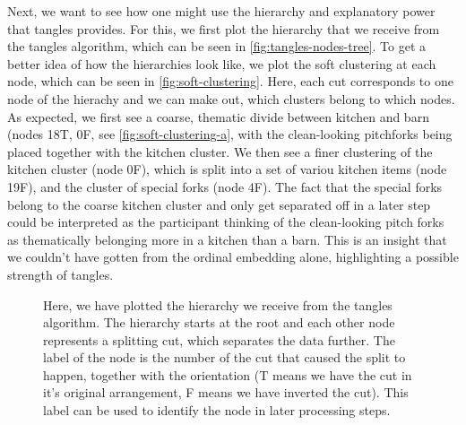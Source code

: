 Next, we want to see how one might use the hierarchy and explanatory power that tangles provides. For this, we first plot the hierarchy that we receive from the tangles
algorithm, which can be seen in \autoref{fig:tangles-nodes-tree}. To get a better idea of how the hierarchies look like, we plot the soft clustering at each node, which
can be seen in \autoref{fig:soft-clustering}. Here, each cut corresponds to one node of the hierachy and we can make out, which
clusters belong to which nodes. As expected, we first see a coarse, thematic divide between kitchen and barn (nodes 18T, 0F, see \autoref{fig:soft-clustering-a}, with 
the clean-looking pitchforks being placed together with the kitchen cluster. 
We then see a finer clustering of the kitchen cluster (node 0F), which is split into a set of variou kitchen items (node 19F), and the cluster of special forks (node 4F). 
The fact that the special forks belong to the coarse kitchen cluster and only get separated off in a later step could be interpreted as the participant thinking of the 
clean-looking pitch forks as thematically belonging more in a kitchen than a barn. This is an insight that we couldn't have gotten from the ordinal embedding alone,
highlighting a possible strength of tangles.


\onecolumn
\begin{figure}[ht]
    \centering
    \caption{
        Here, we have plotted the hierarchy we receive from the tangles algorithm. The hierarchy starts at the root and each other node represents a splitting cut, which
        separates the data further.  The label of the node is the number of the cut that caused the split to happen, together with the orientation (T means we have the cut in
        it's original arrangement, F means we have inverted the cut). This label can be used to identify the node in later processing steps.
    }
    \label{fig:tangles-nodes-tree}
\end{figure}


